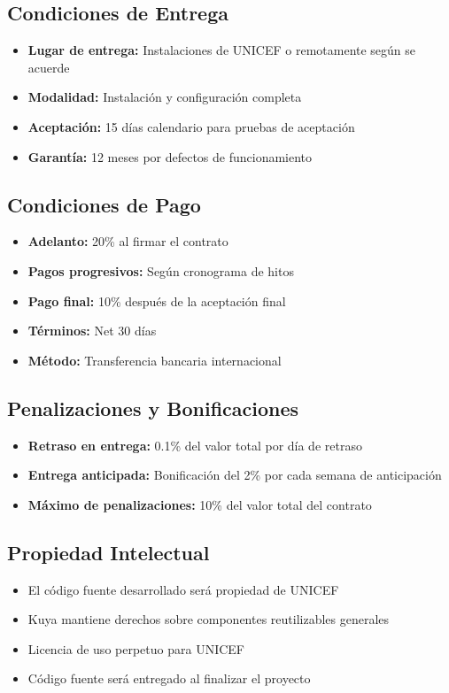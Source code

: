 \subsection{Condiciones de Entrega}
\begin{itemize}
    \item \textbf{Lugar de entrega:} Instalaciones de UNICEF o remotamente según se acuerde
    \item \textbf{Modalidad:} Instalación y configuración completa
    \item \textbf{Aceptación:} 15 días calendario para pruebas de aceptación
    \item \textbf{Garantía:} 12 meses por defectos de funcionamiento
\end{itemize}

\subsection{Condiciones de Pago}
\begin{itemize}
    \item \textbf{Adelanto:} 20\% al firmar el contrato
    \item \textbf{Pagos progresivos:} Según cronograma de hitos
    \item \textbf{Pago final:} 10\% después de la aceptación final
    \item \textbf{Términos:} Net 30 días
    \item \textbf{Método:} Transferencia bancaria internacional
\end{itemize}

\subsection{Penalizaciones y Bonificaciones}
\begin{itemize}
    \item \textbf{Retraso en entrega:} 0.1\% del valor total por día de retraso
    \item \textbf{Entrega anticipada:} Bonificación del 2\% por cada semana de anticipación
    \item \textbf{Máximo de penalizaciones:} 10\% del valor total del contrato
\end{itemize}

\subsection{Propiedad Intelectual}
\begin{itemize}
    \item El código fuente desarrollado será propiedad de UNICEF
    \item Kuya mantiene derechos sobre componentes reutilizables generales
    \item Licencia de uso perpetuo para UNICEF
    \item Código fuente será entregado al finalizar el proyecto
\end{itemize}

